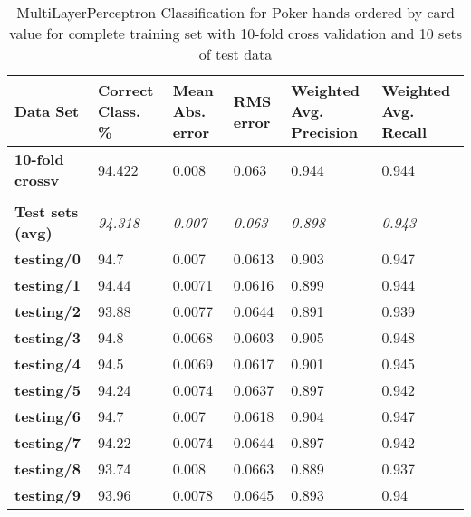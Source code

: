 \documentclass[10pt, a4paper]{article}
\begin{document}
\begin{table}[htbp]
  \centering
  \begin{tabular}{p{3cm}p{1.5cm}p{1.5cm}p{1.5cm}p{1.5cm}p{1.5cm}}
    \toprule
    \textbf{Data Set} & Correct Class. \% & Mean Abs. error & RMS error & Weighted Avg. Precision & Weighted Avg. Recall \\
    \midrule
    \textbf{10-fold crossv} & 94.422 & 0.008 & 0.063 & 0.944 & 0.944 \\
    \textbf{} &       &       &       &       &  \\
    \textbf{Test sets (avg)} & \textit{94.318} & \textit{0.007} & \textit{0.063} & \textit{0.898} & \textit{0.943} \\
    \textbf{   testing/0} & 94.7  & 0.007 & 0.0613 & 0.903 & 0.947 \\
    \textbf{   testing/1} & 94.44 & 0.0071 & 0.0616 & 0.899 & 0.944 \\
    \textbf{   testing/2} & 93.88 & 0.0077 & 0.0644 & 0.891 & 0.939 \\
    \textbf{   testing/3} & 94.8  & 0.0068 & 0.0603 & 0.905 & 0.948 \\
    \textbf{   testing/4} & 94.5  & 0.0069 & 0.0617 & 0.901 & 0.945 \\
    \textbf{   testing/5} & 94.24 & 0.0074 & 0.0637 & 0.897 & 0.942 \\
    \textbf{   testing/6} & 94.7  & 0.007 & 0.0618 & 0.904 & 0.947 \\
    \textbf{   testing/7} & 94.22 & 0.0074 & 0.0644 & 0.897 & 0.942 \\
    \textbf{   testing/8} & 93.74 & 0.008 & 0.0663 & 0.889 & 0.937 \\
    \textbf{   testing/9} & 93.96 & 0.0078 & 0.0645 & 0.893 & 0.94 \\
    \bottomrule
    \end{tabular}%


\caption{MultiLayerPerceptron Classification for Poker hands ordered by card value for complete training set with 10-fold cross validation and 10 sets of test data}   
  \label{tab:nnocresults}%
\end{table}%
\end{document}
